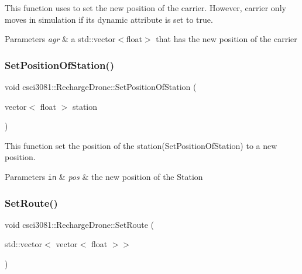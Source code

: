 This function uses to set the new position of the carrier. However, carrier only moves in simulation if its dynamic attribute is set to true. 


\begin{DoxyParams}{Parameters}
{\em agr} & a std\+::vector$<$float$>$ that has the new position of the carrier \\
\hline
\end{DoxyParams}
\mbox{\label{classcsci3081_1_1RechargeDrone_a0bd3d0f578960d5a58842781c8dccd46}} 
\subsubsection{\texorpdfstring{Set\+Position\+Of\+Station()}{SetPositionOfStation()}}
{\footnotesize\ttfamily void csci3081\+::\+Recharge\+Drone\+::\+Set\+Position\+Of\+Station (\begin{DoxyParamCaption}\item[{vector$<$ float $>$}]{station }\end{DoxyParamCaption})}



This function set the position of the station(\+Set\+Position\+Of\+Station) to a new position. 


\begin{DoxyParams}[1]{Parameters}
\mbox{\tt in}  & {\em pos} & the new position of the Station \\
\hline
\end{DoxyParams}
\mbox{\label{classcsci3081_1_1RechargeDrone_a06c5c7bde0b661c5920ad9dc0e8e5420}} 
\subsubsection{\texorpdfstring{Set\+Route()}{SetRoute()}}
{\footnotesize\ttfamily void csci3081\+::\+Recharge\+Drone\+::\+Set\+Route (\begin{DoxyParamCaption}\item[{std\+::vector$<$ vector$<$ float $>$$>$}]{ }\end{DoxyParamCaption})}



